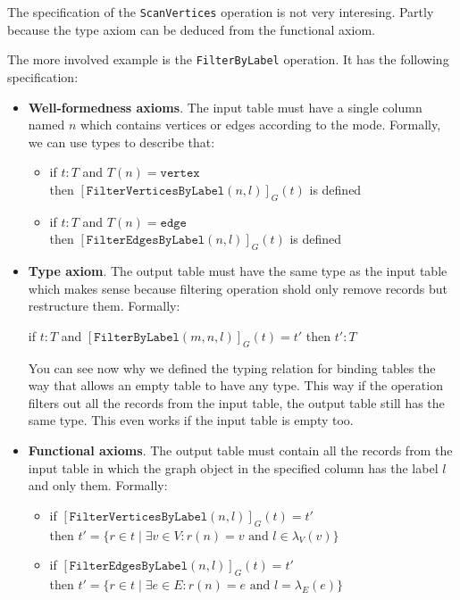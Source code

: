 \documentclass[14pt]{constructor-thesis}
\theoremstyle{definition}
\begin{document}
The specification of the \texttt{ScanVertices} operation is not very interesing. Partly because the type axiom can be deduced from the functional axiom.

The more involved example is the \texttt{FilterByLabel} operation. It has the following specification:
\begin{itemize}
  \item \textbf{Well-formedness axioms}. The input table must have a single column named $n$ which contains vertices or edges according to the mode. Formally, we can use types to describe that:
  \begin{itemize}
    \item if $t : T$ and $T(n) = \texttt{vertex}$ \\
    then $[\texttt{FilterVerticesByLabel}(n, l)]_G(t)$ is defined 
    \item if $t : T$ and $T(n) = \texttt{edge}$ \\
    then $[\texttt{FilterEdgesByLabel}(n, l)]_G(t)$ is defined 
  \end{itemize}

  \item \textbf{Type axiom}. The output table must have the same type as the input table which makes sense because filtering operation shold only remove records but restructure them. Formally:
  \begin{center}
    if $t : T$ and $[\texttt{FilterByLabel}(m, n, l)]_G(t) = t'$
    then $t' : T$
  \end{center}

  You can see now why we defined the typing relation for binding tables the way that allows an empty table to have any type. This way if the operation filters out all the records from the input table, the output table still has the same type. This even works if the input table is empty too.

  \item \textbf{Functional axioms}. The output table must contain all the records from the input table in which the graph object in the specified column has the label $l$ and only them. Formally:
  \begin{itemize}
    \item if $[\texttt{FilterVerticesByLabel}(n, l)]_G(t) = t'$ \\
    then $t' = \{ r \in t \mid \exists v \in V : r(n) = v \text{ and } l \in \lambda_V(v) \}$
    \item if $[\texttt{FilterEdgesByLabel}(n, l)]_G(t) = t'$ \\
    then $t' = \{ r \in t \mid \exists e \in E : r(n) = e \text{ and } l = \lambda_E(e) \}$
  \end{itemize}
\end{itemize}
\end{document}

